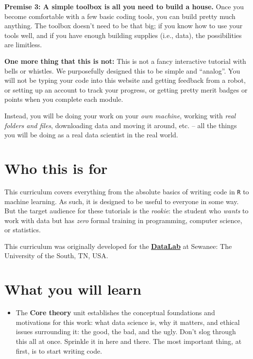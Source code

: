\documentclass[
]{book}
\providecommand{\tightlist}{%
  \setlength{\itemsep}{0pt}\setlength{\parskip}{0pt}}
\begin{document}
\textbf{Premise 3: A simple toolbox is all you need to build a house.} Once you become comfortable with a few basic coding tools, you can build pretty much anything. The toolbox doesn't need to be that big; if you know how to use your tools well, and if you have enough building supplies (i.e., data), the possibilities are limitless.

\textbf{One more thing that this is not:} This is not a fancy interactive tutorial with bells or whistles. We purposefully designed this to be simple and ``analog''. You will not be typing your code into this website and getting feedback from a robot, or setting up an account to track your progress, or getting pretty merit badges or points when you complete each module.

Instead, you will be doing your work on your \emph{own machine}, working with \emph{real folders and files}, downloading data and moving it around, etc. -- all the things you will be doing as a real data scientist in the real world.

\hypertarget{who-this-is-for}{%
\section*{Who this is for}\label{who-this-is-for}}

This curriculum covers everything from the absolute basics of writing code in \texttt{R} to machine learning. As such, it is designed to be useful to everyone in some way. But the target audience for these tutorials is the \emph{rookie}: the student who \emph{wants} to work with data but has \emph{zero} formal training in programming, computer science, or statistics.

This curriculum was originally developed for the \href{www.new.sewanee.edu/sewanee-datalab}{\textbf{DataLab}} at Sewanee: The University of the South, TN, USA.

\hypertarget{what-you-will-learn}{%
\section*{What you will learn}\label{what-you-will-learn}}

\begin{itemize}
\tightlist
\item
  The \textbf{Core theory} unit establishes the conceptual foundations and motivations for this work: what data science is, why it matters, and ethical issues surrounding it: the good, the bad, and the ugly. Don't slog through this all at once. Sprinkle it in here and there. The most important thing, at first, is to start writing code.
\end{itemize}
\end{document}
